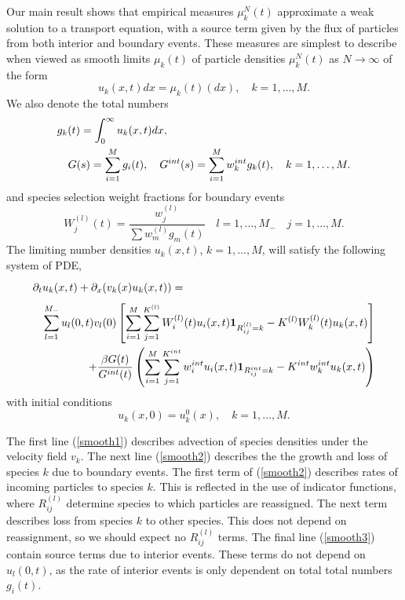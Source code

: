 Our main result shows that empirical measures $\mu^N_k(t)$ approximate a weak solution to a transport equation, with a source term given by the flux of particles from both interior and boundary events. These measures are simplest to describe  when viewed as smooth limits $\mu_k(t)$  of particle densities $\mu_k^N(t)$ as $N\rightarrow \infty$ of the form
\begin{equation}
u_k(x,t)dx = \mu_{k}(t)(dx),     \quad k = 1, \dots, M.  
\end{equation}
We also denote the total numbers
\begin{eqnarray}
\lefteqn{g_k(t)= \int_0^\infty u_k(x,t) dx,}\\
&& G(s) = \sum_{i = 1}^M g_i(t), \quad G^{int}(s) = \sum_{i = 1}^Mw_k^{int}g_k(t), \quad k = 1, \dots, M. \nonumber 
 \end{eqnarray}
and species selection weight fractions for boundary events
\begin{equation}\label{sswf}
W_j^{(l)}(t)= \frac{w^{(l)}_j}{\sum w^{(l)}_m g_m(t)} \quad l = 1,\dots, M_{-} \quad j = 1,\dots, M.
\end{equation}
The limiting number densities $u_k(x,t)$, $k = 1, \dots, M$, will satisfy the following system of PDE,
 \begin{eqnarray} 
  \lefteqn{\partial_t u_k(x,t)+\partial_{x}(v_k(x)u_{k}(x,t))=  \phantom{u_j(x,t)\mathbf{1}_{R^{(l)}_{ij}}
-K^{(l)}W_k^{(l)}(t)u_k(x,t)}}\label{smooth1}\\
 && \sum_{l = 1}^{M_-}u_l(0,t)v_{l}(0)\left[\sum_{i = 1}^{M}\sum_{j= 1}^{K^{(l)}} W_i^{(l)}(t)u_i(x,t)\mathbf{1}_{R^{(l)}_{ij}=k}
-K^{(l)}W_k^{(l)}(t)u_k(x,t)\right]\label{smooth2}\\ 
&&+\frac{\beta G(t)}{G^{int}(t)}\left( \sum_{i = 1}^{M}\sum_{j= 1}^{K^{int}} w^{int} _iu_{i}(x,t)\mathbf{1}_{R^{int}_{ij} = k}-K^{int}w^{int}_ku_{k}(x,t)
 \right)\label{smooth3}
 \end{eqnarray}
 with initial conditions 
 \begin{equation}
u_k(x,0) = u_{k}^0(x), \quad k = 1,\dots, M.
\end{equation}

  The first line (\ref{smooth1}) describes advection of species densities under the velocity field $v_k$.  The next line (\ref{smooth2}) describes the  the growth and loss of species $k$ due to boundary events. The first term of  (\ref{smooth2}) describes rates of incoming particles to species $k$.  This is reflected in the use of indicator functions, where  $R_{ij}^{(l)}$ determine species to which particles are reassigned. The next term describes loss from species $k$ to other species. This does not depend on reassignment, so we should expect no $R_{ij}^{(l)}$ terms.      The final line (\ref{smooth3}) contain source terms due to interior events.  These terms do not depend on $u_l(0,t)$, as the rate of interior events is only dependent on total total numbers $g_i(t)$.

